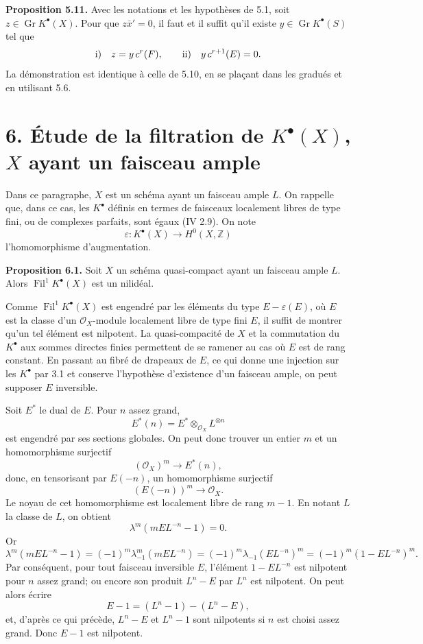 \documentclass[11pt]{article}
\newcommand{\Fil}{\operatorname{Fil}}
\begin{document}
\textbf{Proposition 5.11.} Avec les notations et les hypothèses de 5.1, soit \(z\in\operatorname{Gr}K^\bullet(X)\). Pour que \(z\bar x'=0\), il faut et il suffit qu'il existe \(y\in\operatorname{Gr}K^\bullet(S)\) tel que
\[
  \text{\rm i)}\quad z=y\,c^r(F),
  \qquad
  \text{\rm ii)}\quad y\,c^{r+1}(E)=0.
\]
La démonstration est identique à celle de 5.10, en se plaçant dans les gradués et en utilisant 5.6.

\section*{6. Étude de la filtration de \(K^\bullet(X)\), \(X\) ayant un faisceau ample}

Dans ce paragraphe, \(X\) est un schéma ayant un faisceau ample \(L\). On rappelle que, dans ce cas, les \(K^\bullet\) définis en termes de faisceaux localement libres de type fini, ou de complexes parfaits, sont égaux (IV 2.9). On note
\[
  \varepsilon:K^\bullet(X)\longrightarrow H^0(X,\mathbb Z)
\]
l'homomorphisme d'augmentation.

\textbf{Proposition 6.1.} Soit \(X\) un schéma quasi-compact ayant un faisceau ample \(L\). Alors \(\Fil^1K^\bullet(X)\) est un nilidéal.

Comme \(\Fil^1K^\bullet(X)\) est engendré par les éléments du type \(E-\varepsilon(E)\), où \(E\) est la classe d'un \(\mathcal O_X\)-module localement libre de type fini \(E\), il suffit de montrer qu'un tel élément est nilpotent. La quasi-compacité de \(X\) et la commutation du \(K^\bullet\) aux sommes directes finies permettent de se ramener au cas où \(E\) est de rang constant. En passant au fibré de drapeaux de \(E\), ce qui donne une injection sur les \(K^\bullet\) par 3.1 et conserve l'hypothèse d'existence d'un faisceau ample, on peut supposer \(E\) inversible.

Soit \(E^*\) le dual de \(E\). Pour \(n\) assez grand,
\[
  E^*(n)=E^*\otimes_{\mathcal O_X}L^{\otimes n}
\]
est engendré par ses sections globales. On peut donc trouver un entier \(m\) et un homomorphisme surjectif
\[
  (\mathcal O_X)^m\longrightarrow E^*(n),
\]
donc, en tensorisant par \(E(-n)\), un homomorphisme surjectif
\[
  (E(-n))^m\longrightarrow\mathcal O_X.
\]
Le noyau de cet homomorphisme est localement libre de rang \(m-1\). En notant \(L\) la classe de \(L\), on obtient
\[
  \lambda^m(mEL^{-n}-1)=0.
\]
Or
\[
 \lambda^m(mEL^{-n}-1)=(-1)^m\lambda_{-1}^m(mEL^{-n})
 =(-1)^m\lambda_{-1}(EL^{-n})^m
 =(-1)^m(1-EL^{-n})^m.
\]
Par conséquent, pour tout faisceau inversible \(E\), l'élément \(1-EL^{-n}\) est nilpotent pour \(n\) assez grand; ou encore son produit \(L^n-E\) par \(L^n\) est nilpotent. On peut alors écrire
\[
  E-1=(L^n-1)-(L^n-E),
\]
et, d'après ce qui précède, \(L^n-E\) et \(L^n-1\) sont nilpotents si \(n\) est choisi assez grand. Donc \(E-1\) est nilpotent.
\end{document}
